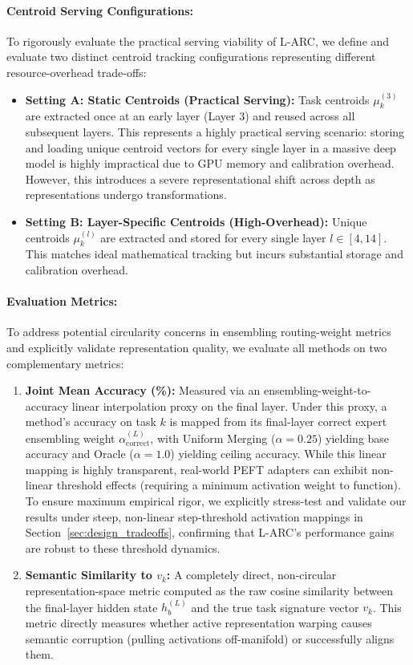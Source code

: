 \paragraph{Centroid Serving Configurations:}
To rigorously evaluate the practical serving viability of L-ARC, we define and evaluate two distinct centroid tracking configurations representing different resource-overhead trade-offs:
\begin{itemize}
    \item \textbf{Setting A: Static Centroids (Practical Serving):} Task centroids $\mu_k^{(3)}$ are extracted once at an early layer (Layer 3) and reused across all subsequent layers. This represents a highly practical serving scenario: storing and loading unique centroid vectors for every single layer in a massive deep model is highly impractical due to GPU memory and calibration overhead. However, this introduces a severe representational shift across depth as representations undergo transformations.
    \item \textbf{Setting B: Layer-Specific Centroids (High-Overhead):} Unique centroids $\mu_k^{(l)}$ are extracted and stored for every single layer $l \in [4, 14]$. This matches ideal mathematical tracking but incurs substantial storage and calibration overhead.
\end{itemize}

\paragraph{Evaluation Metrics:}
To address potential circularity concerns in ensembling routing-weight metrics and explicitly validate representation quality, we evaluate all methods on two complementary metrics:
\begin{enumerate}
    \item \textbf{Joint Mean Accuracy (\%):} Measured via an ensembling-weight-to-accuracy linear interpolation proxy on the final layer. Under this proxy, a method's accuracy on task $k$ is mapped from its final-layer correct expert ensembling weight $\alpha_{\text{correct}}^{(L)}$, with Uniform Merging ($\alpha=0.25$) yielding base accuracy and Oracle ($\alpha=1.0$) yielding ceiling accuracy. While this linear mapping is highly transparent, real-world PEFT adapters can exhibit non-linear threshold effects (requiring a minimum activation weight to function). To ensure maximum empirical rigor, we explicitly stress-test and validate our results under steep, non-linear step-threshold activation mappings in Section~\ref{sec:design_tradeoffs}, confirming that L-ARC's performance gains are robust to these threshold dynamics.
    \item \textbf{Semantic Similarity to $v_k$:} A completely direct, non-circular representation-space metric computed as the raw cosine similarity between the final-layer hidden state $h_b^{(L)}$ and the true task signature vector $v_k$. This metric directly measures whether active representation warping causes semantic corruption (pulling activations off-manifold) or successfully aligns them.
\end{enumerate}

